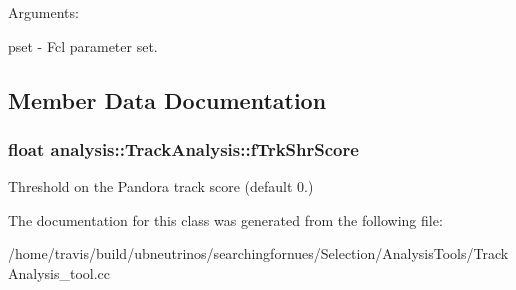 Arguments\+:

pset -\/ Fcl parameter set. 

\subsection{Member Data Documentation}
\subsubsection[{\texorpdfstring{f\+Trk\+Shr\+Score}{fTrkShrScore}}]{\setlength{\rightskip}{0pt plus 5cm}float analysis\+::\+Track\+Analysis\+::f\+Trk\+Shr\+Score\hspace{0.3cm}{\ttfamily [private]}}\hypertarget{classanalysis_1_1TrackAnalysis_a49502213574f13be542aaab647940ffd}{}\label{classanalysis_1_1TrackAnalysis_a49502213574f13be542aaab647940ffd}
Threshold on the Pandora track score (default 0.) 

The documentation for this class was generated from the following file\+:\begin{DoxyCompactItemize}
\item 
/home/travis/build/ubneutrinos/searchingfornues/\+Selection/\+Analysis\+Tools/Track\+Analysis\+\_\+tool.\+cc\end{DoxyCompactItemize}
